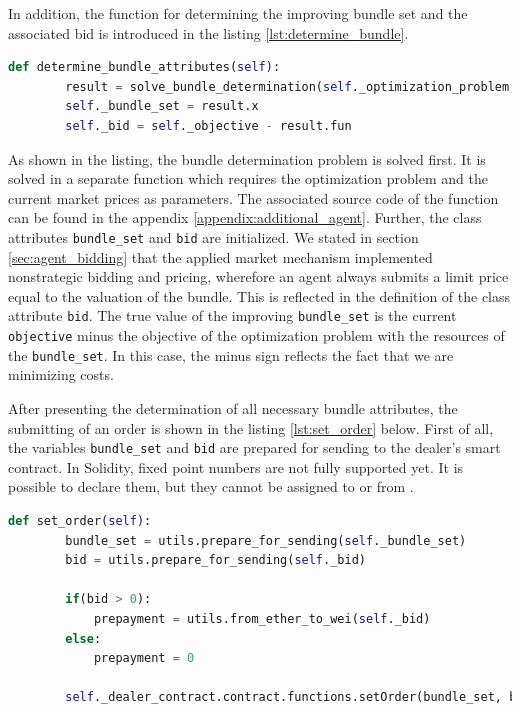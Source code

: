 In addition, the function for determining the improving bundle set and the associated bid is introduced in the listing \ref{lst:determine_bundle}.

\begin{lstlisting}[label=lst:determine_bundle, caption=Determining of bundle attributes, language=Python]
    def determine_bundle_attributes(self):
        result = solve_bundle_determination(self._optimization_problem, self._mkt_prices)
        self._bundle_set = result.x
        self._bid = self._objective - result.fun
\end{lstlisting}

As shown in the listing, the bundle determination problem is solved first.
It is solved in a separate function which requires the optimization problem and the current market prices as parameters.
The associated source code of the function can be found in the appendix \ref{appendix:additional_agent}.
Further, the class attributes \verb|bundle_set| and \verb|bid| are initialized.
We stated in section \ref{sec:agent_bidding} that the applied market mechanism implemented nonstrategic bidding and pricing, wherefore 
an agent always submits a limit price equal to the valuation of the bundle. 
This is reflected in the definition of the class attribute \verb|bid|. The true value of the improving \verb|bundle_set| 
is the current \verb|objective| minus the objective of the optimization problem with the resources of the \verb|bundle_set|.
In this case, the minus sign reflects the fact that we are minimizing costs.

After presenting the determination of all necessary bundle attributes, the submitting of an order is shown in the listing \ref{lst:set_order} below.
First of all, the variables \verb|bundle_set| and \verb|bid| are prepared for sending to the dealer's smart contract.
In Solidity, fixed point numbers are not fully supported yet. It is possible to declare them, but they cannot be assigned to or from .

\begin{lstlisting}[float=htbp, label=lst:set_order, caption=Submitting of order, language=Python]
    def set_order(self):
        bundle_set = utils.prepare_for_sending(self._bundle_set)
        bid = utils.prepare_for_sending(self._bid)
        
        if(bid > 0):
            prepayment = utils.from_ether_to_wei(self._bid)
        else:
            prepayment = 0

        self._dealer_contract.contract.functions.setOrder(bundle_set, bid, prepayment).transact({'from': self._account_address, 'value': prepayment})
\end{lstlisting}

